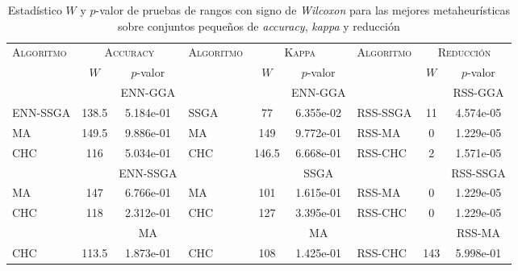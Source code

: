 \begin{table}[]
\centering
\begin{adjustbox}{max width =\textwidth}
\begin{tabular}{l c c|l c c| l c c}
\hline
	  \textsc{Algoritmo}
	& \multicolumn{2}{c}{\textsc{Accuracy}}
	& \multicolumn{1}{|c}{\textsc{Algoritmo}}
	& \multicolumn{2}{c}{\textsc{Kappa}}
	& \multicolumn{1}{|c}{\textsc{Algoritmo}}
	& \multicolumn{2}{c}{\textsc{Reducción}}\\ 
 & $W$ & $p$-valor & & $W$ & $p$-valor & & $W$ & $p$-valor  \\
\hline
\hline

 & & ENN-GGA & & & ENN-GGA & & & RSS-GGA \\

ENN-SSGA & 138.5 & 5.184e-01 & SSGA & 77 & 6.355e-02 &  RSS-SSGA & 11 & 4.574e-05 \\
MA & 149.5 & 9.886e-01 & MA & 149 & 9.772e-01 & RSS-MA & 0 & 1.229e-05 \\
CHC & 116 & 5.034e-01 & CHC & 146.5 & 6.668e-01 & RSS-CHC & 2 & 1.571e-05 \\

\hline
 
  & & ENN-SSGA & & & SSGA & & & RSS-SSGA \\

MA & 147 & 6.766e-01 & MA & 101 & 1.615e-01 & RSS-MA & 0 & 1.229e-05 \\
CHC & 118 & 2.312e-01 & CHC & 127 & 3.395e-01 & RSS-CHC & 0 & 1.229e-05 \\

\hline

  & & MA & & & MA & & & RSS-MA \\

CHC & 113.5 & 1.873e-01 & CHC & 108 & 1.425e-01 & RSS-CHC & 143 & 5.998e-01 \\

\hline

\end{tabular}
\end{adjustbox}
\caption[Pruebas de \emph{Wilcoxon} entre las mejores metaheurísticas para los conjuntos pequeños sobre \emph{accuracy}, \emph{kappa} y reducción]{Estadístico $W$ y $p$-valor de pruebas de rangos con signo de \emph{Wilcoxon} para las mejores metaheurísticas sobre conjuntos pequeños de \emph{accuracy}, \emph{kappa} y reducción}
\label{wilcox1-all-peq}
\end{table}


